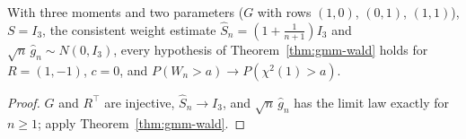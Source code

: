 \begin{theorem}[Wald test of \texorpdfstring{$\theta_1 = \theta_2$}{theta1 = theta2} after GMM]
\label{thm:gmm-wald-rect-witness}
\leanok
{}
With three moments and two parameters ($G$ with rows $(1,0)$, $(0,1)$, $(1,1)$), $S = I_3$, the consistent weight
estimate $\hat S_n = (1+\frac1{n+1})I_3$ and $\sqrt n\,\hat g_n\sim N(0,I_3)$, every hypothesis of
Theorem~\ref{thm:gmm-wald} holds for $R = (1,-1)$, $c = 0$, and $P(W_n > a)\to P(\chi^2(1) > a)$.
\end{theorem}
\begin{proof}
\leanok
$G$ and $R^\top$ are injective, $\hat S_n\to I_3$, and $\sqrt n\,\hat g_n$ has the limit law exactly for $n\ge1$; apply
Theorem~\ref{thm:gmm-wald}.
\end{proof}
